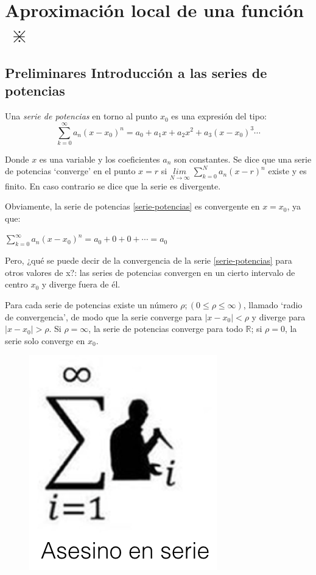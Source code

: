 \chapter{Aproximación local de una función $\; \divideontimes$ }	

\section{Preliminares Introducción a las series de potencias}

Una \emph{serie de potencias} en torno al punto $x_0$ es una expresión del tipo:
\begin{equation}
	\label{serie-potencias}
	\sum _{ k=0 }^{ \infty }{a_n(x-x_0)^n}=a_0+a_1x+a_2x^2+a_3(x-x_0)^3\cdots 
\end{equation}

Donde $x$ es una variable y los coeficientes $a_n$ son constantes. Se dice que una serie de potencias `converge' en el punto $x=r$  si $\underset{N\to \infty}{lim }\;{\sum _{ k=0 }^{ N }{a_n(x-r)^n}}$ existe y es finito. En caso contrario se dice que la serie es divergente.

Obviamente, la serie de potencias \ref{serie-potencias} es convergente en $x=x_0$, ya que: 

$\sum _{ k=0 }^{ \infty }{a_n(x-x_0)^n}=a_0+0+0+\cdots =a_0$

	\begin{multicols}{2}
	Pero, ¿qué se puede decir de la convergencia de la serie \ref{serie-potencias} para otros valores de x?: las series de potencias convergen en un cierto intervalo de centro $x_0$ y diverge fuera de él. 

	Para cada serie de potencias existe un número $\rho; (0\le \rho \le \infty)$, llamado `radio de convergencia', de modo que la serie converge para $|x-x_0|<\rho$ y diverge para $|x-x_0|>\rho$. Si $\rho=\infty$, la serie de potencias converge para todo $\mathbb R$; si $\rho=0$, la serie solo converge en $x_0$.

	\begin{figure}[H]
		\centering
		\includegraphics[width=0.25
	\textwidth]{imagenes/imagenes06/xiste06.png}
	\end{figure}
	\end{multicols}


